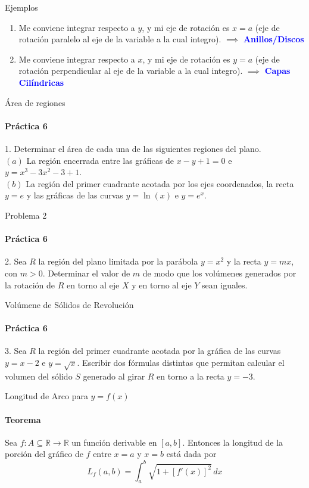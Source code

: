 \documentclass{plantillaPPT}
\begin{document}
\begin{frame}{Ejemplos}
\begin{enumerate}
    \item Me conviene integrar respecto a \(y\), y mi eje de rotación es \(x=a\) (eje de rotación paralelo al eje de la variable a la cual integro). \(\implies\) \textcolor{blue}{\textbf{Anillos/Discos}}
    \item Me conviene integrar respecto a \(x\), y mi eje de rotación es \(y=a\) (eje de rotación perpendicular al eje de la variable a la cual integro). \(\implies\) \textcolor{blue}{\textbf{Capas Cilíndricas}}
\end{enumerate}
    
\end{frame}

\begin{frame}{Área de regiones}
\framesubtitle{Práctica 6}

1. Determinar el área de cada una de las siguientes regiones del plano.\\[15pt]
\((a)\) La región encerrada entre las gráficas de \(x-y+1=0\) e \(y=x^3-3x^2-3+1\).\\[5pt]
\((b)\) La región del primer cuadrante acotada por los ejes coordenados, la recta \(y=e\) y las gráficas de las curvas \(y=\ln(x)\) e \(y=e^x\).
    
\end{frame}

\begin{frame}{Problema 2}
\framesubtitle{Práctica 6}
2. Sea \(R\) la región del plano limitada por la parábola \(y=x^2\) y la recta \(y=mx\), con \(m>0\). Determinar el valor de \(m\) de modo que los volúmenes generados por la rotación de \(R\) en torno al eje \(X\) y en torno al eje \(Y\) sean iguales.
    
\end{frame}

\begin{frame}{Volúmene de Sólidos de Revolución}
\framesubtitle{Práctica 6}

3. Sea \(R\) la región del primer cuadrante acotada por la gráfica de las curvas \(y=x-2\) e \(y=\sqrt{x}\). Escribir dos fórmulas distintas que permitan calcular el volumen del sólido \(S\) generado al girar \(R\) en torno a la recta \(y=-3\).
\end{frame}

\begin{frame}{Longitud de Arco para \(y=f(x)\)}
\framesubtitle{Teorema}

\begin{teorema}
    Sea \(f:A\subseteq\mathbb{R}\to\mathbb{R}\) un función derivable en \([a,b]\). Entonces la longitud de la porción del gráfico de \(f\) entre \(x=a\) y \(x=b\) está dada por
    \[
    L_f(a,b) = \int_a^b \sqrt{1+[f'(x)]^2}\,dx
    \]
\end{teorema}    
\end{frame}
\end{document}
